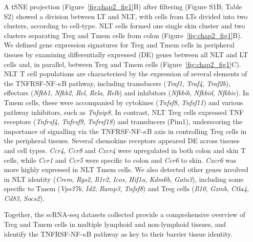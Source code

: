 A tSNE projection (Figure~\ref{fig:chap2_fig1}B) after filtering (Figure S1B; Table S2) showed a division between LT and NLT, with cells from LTs divided into two clusters, according to cell-type. NLT cells formed one single skin cluster and two clusters separating Treg and Tmem cells from colon (Figure~\ref{fig:chap2_fig1}B). We defined gene expression signatures for Treg and Tmem cells in peripheral tissues by examining differentially expressed (DE) genes between all NLT and LT cells and, in parallel, between Treg and Tmem cells (Figure~\ref{fig:chap2_fig1}C). NLT T cell populations are characterised by the expression of several elements of the TNFRSF-NF-$\kappa$B pathway, including transducers (\textit{Traf1}, \textit{Traf4}, \textit{Traf2b}), effectors (\textit{Nfkb1}, \textit{Nfkb2}, \textit{Rel}, \textit{Rela}, \textit{Relb}) and inhibitors (\textit{Nfkbib}, \textit{Nfkbid}, \textit{Nfkbie}). In Tmem cells, these were accompanied by cytokines (\textit{Tnfsf8}, \textit{Tnfsf11}) and various pathway inhibitors, such as \textit{Tnfaip8}. In contrast, NLT Treg cells expressed TNF receptors (\textit{Tnfrsf4}, \textit{Tnfrsf9}, \textit{Tnfrsf18}) and transducers (Pim1), underscoring the importance of signalling via the TNFRSF-NF-$\kappa$B axis in controlling Treg cells in the peripheral tissues. Several chemokine receptors appeared DE across tissues and cell types. \textit{Ccr4}, \textit{Ccr8} and \textit{Cxcr4} were upregulated in both colon and skin T cells, while \textit{Ccr1} and \textit{Ccr5} were specific to colon and \textit{Ccr6} to skin. \textit{Cxcr6} was more highly expressed in NLT Tmem cells. We also detected other genes involved in NLT identity (\textit{Crem}, \textit{Rgs2}, \textit{Il1r2}, \textit{Icos}, \textit{Hif1a}, \textit{Kdm6b}, \textit{Gata3}), including some specific to Tmem (\textit{Vps37b}, \textit{Id2}, \textit{Ramp3}, \textit{Tnfsf8}) and Treg cells (\textit{Il10}, \textit{Gzmb}, \textit{Ctla4}, \textit{Cd83}, \textit{Socs2}).

Together, the scRNA-seq datasets collected provide a comprehensive overview of Treg and Tmem cells in multiple lymphoid and non-lymphoid tissues, and identify the TNFRSF-NF-$\kappa$B pathway as key to their barrier tissue identity.

